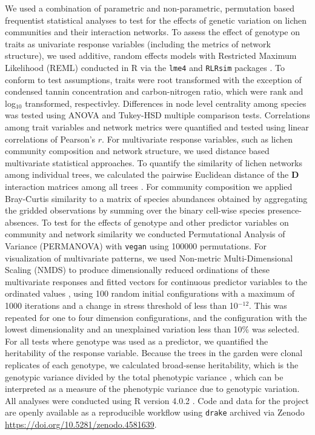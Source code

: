 \documentclass[fleqn,12pt]{olplainarticle}
\begin{document}
We used a combination of parametric and non-parametric, permutation
based frequentist statistical analyses to test for the effects of
genetic variation on lichen communities and their interaction
networks. To assess the effect of genotype on traits as univariate
response variables (including the metrics of network structure), we
used additive, random effects models with Restricted Maximum
Likelihood (REML) conducted in R via the \texttt{lme4} and
\texttt{RLRsim} packages \citep{lme4, RLRsim}. To conform to test
assumptions, traits were root transformed with the exception of
condensed tannin concentration and carbon-nitrogen ratio, which were
rank and log$_{10}$ transformed, respectivley. Differences in node
level centrality among species was tested using ANOVA and Tukey-HSD
multiple comparison tests. Correlations among trait variables and
network metrics were quantified and tested using linear correlations
of Pearson's $r$. For multivariate response variables, such as lichen
community composition and network structure, we used distance based
multivariate statistical approaches. To quantify the similarity of
lichen networks among individual trees, we calculated the pairwise
Euclidean distance of the $\mathbf{D}$ interaction matrices among all
trees \citep{Newman2010}. For community composition we applied
Bray-Curtis similarity to a matrix of species abundances obtained by
aggregating the gridded observations by summing over the binary
cell-wise species presence-absences. To test for the effects of
genotype and other predictor variables on community and network
similarity we conducted Permutational Analysis of Variance (PERMANOVA)
with \texttt{vegan} \citep{vegan} using 100000 permutations. For
visualization of multivariate patterns, we used Non-metric
Multi-Dimensional Scaling (NMDS) \citep{ecodist} to produce
dimensionally reduced ordinations of these multivariate responses and
fitted vectors for continuous predictor variables to the ordinated
values \citep{vegan}, using 100 random initial configurations with a
maximum of 1000 iterations and a change in stress threshold of less
than 10$^{-12}$. This was repeated for one to four dimension
configurations, and the configuration with the lowest dimensionality
and an unexplained variation less than 10\% was selected. For all
tests where genotype was used as a predictor, we quantified the
heritability of the response variable. Because the trees in the garden
were clonal replicates of each genotype, we calculated broad-sense
heritability, which is the genotypic variance divided by the total
phenotypic variance \citep{Conner2004ATextbook}, which can be
interpreted as a measure of the phenotypic variance due to genotypic
variation. All analyses were conducted using R version 4.0.2
\citep{R2020}. Code and data for the project are openly available as a
reproducible workflow using \texttt{drake} \citep{drake} archived via
Zenodo \url{https://doi.org/10.5281/zenodo.4581639}.
\end{document}
